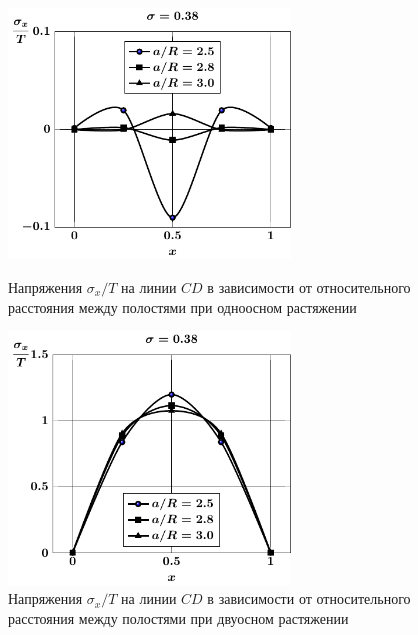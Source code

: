 \begin{figure}[h!]
\centering\footnotesize
\parbox[b]{7.5cm}{\centering\includegraphics[width=7.5cm]{spheres-cav13-a-t1-sig_x-cd.pdf}
\caption{Напряжения $\sigma_x/T$ на линии $CD$ в зависимости от относительного расстояния между полостями при одноосном растяжении
\label{f:8:44}}}\hfil\hfil
\parbox[b]{7.5cm}{\centering\includegraphics[width=7.5cm]{spheres-cav13-a-t2-sig_x-cd.pdf}
\caption{Напряжения $\sigma_x/T$ на линии $CD$ в зависимости от относительного расстояния между полостями при двуосном растяжении
\label{f:8:45}}}
\end{figure}

